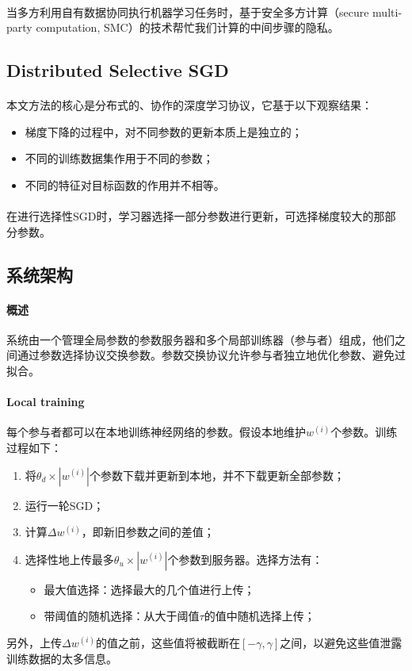 \documentclass[12pt,a4paper]{article}
\begin{document}
\paragraph{} 当多方利用自有数据协同执行机器学习任务时，基于安全多方计算（secure multi-party computation, SMC）的技术帮忙我们计算的中间步骤的隐私。

\subsection{Distributed Selective SGD}
\paragraph{} 本文方法的核心是分布式的、协作的深度学习协议，它基于以下观察结果：
\begin{itemize}
	\item 梯度下降的过程中，对不同参数的更新本质上是独立的；
	\item 不同的训练数据集作用于不同的参数；
	\item 不同的特征对目标函数的作用并不相等。
\end{itemize}
\paragraph{} 在进行选择性SGD时，学习器选择一部分参数进行更新，可选择梯度较大的那部分参数。
\subsection{系统架构}
\paragraph{概述} 系统由一个管理全局参数的参数服务器和多个局部训练器（参与者）组成，他们之间通过参数选择协议交换参数。参数交换协议允许参与者独立地优化参数、避免过拟合。
\paragraph{Local training} 每个参与者都可以在本地训练神经网络的参数。假设本地维护$w^{(i)}$个参数。训练过程如下：
\begin{enumerate}
	\item 将$\theta_d \times |w^{(i)}|$个参数下载并更新到本地，并不下载更新全部参数；
	\item 运行一轮SGD；
	\item 计算$\Delta w^{(i)}$，即新旧参数之间的差值；
	\item 选择性地上传最多$\theta_u \times |w^{(i)}|$个参数到服务器。选择方法有：
	\begin{itemize}
		\item 最大值选择：选择最大的几个值进行上传；
		\item 带阈值的随机选择：从大于阈值$\tau$的值中随机选择上传；
	\end{itemize}
\end{enumerate}
另外，上传$\Delta w^{(i)}$的值之前，这些值将被截断在$[-\gamma, \gamma]$之间，以避免这些值泄露训练数据的太多信息。
\end{document}
